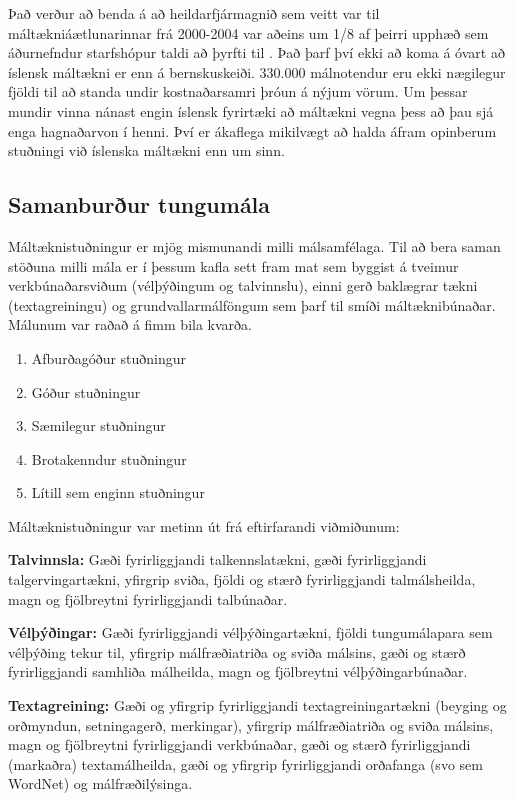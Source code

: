 \begin{multicols}{2}
Það verður að benda á að heildarfjármagnið sem veitt var til máltækniáætlunarinnar frá 2000-2004 var aðeins um 1/8 af þeirri upphæð sem áðurnefndur starfshópur taldi að þyrfti til \cite{ilrt1}.  Það þarf því ekki að koma á óvart að íslensk máltækni er enn á bernskuskeiði. 330.000 málnotendur eru ekki nægilegur fjöldi til að standa undir kostnaðarsamri þróun á nýjum vörum. Um þessar mundir vinna nánast engin íslensk fyrirtæki að máltækni vegna þess að þau sjá enga hagnaðarvon í henni. Því er ákaflega mikilvægt að halda áfram opinberum stuðningi við íslenska máltækni enn um sinn.

\subsection{Samanburður tungumála}

Máltæknistuðningur er mjög mismunandi milli málsamfélaga. Til að bera saman stöðuna milli mála er í þessum kafla sett fram mat sem byggist á tveimur verkbúnaðarsviðum (vélþýðingum og talvinnslu), einni gerð baklægrar tækni (textagreiningu) og grundvallarmálföngum sem þarf til smíði máltæknibúnaðar. Málunum var raðað á fimm bila kvarða.

\begin{enumerate}
\item Afburðagóður stuðningur
\item Góður stuðningur
\item Sæmilegur stuðningur
\item Brotakenndur stuðningur
\item Lítill sem enginn stuðningur
\end{enumerate}

Máltæknistuðningur var metinn út frá eftirfarandi viðmiðunum: 

\textbf{Talvinnsla:} Gæði fyrirliggjandi talkennslatækni, gæði fyrirliggjandi talgervingartækni, yfirgrip sviða, fjöldi og stærð fyrirliggjandi talmálsheilda, magn og fjölbreytni fyrirliggjandi talbúnaðar.

\textbf{Vélþýðingar:} Gæði fyrirliggjandi vélþýðingartækni, fjöldi tungumálapara sem vélþýðing tekur til, yfirgrip málfræðiatriða og sviða málsins, gæði og stærð fyrirliggjandi samhliða málheilda, magn og fjölbreytni vélþýðingarbúnaðar.

\textbf{Textagreining:} Gæði og yfirgrip fyrirliggjandi textagreiningartækni (beyging og orðmyndun, setningagerð, merkingar), yfirgrip málfræðiatriða og sviða málsins, magn og fjölbreytni fyrirliggjandi verkbúnaðar, gæði og stærð fyrirliggjandi (markaðra) textamálheilda, gæði og yfirgrip fyrirliggjandi orðafanga (svo sem WordNet) og málfræðilýsinga.


\end{multicols}

